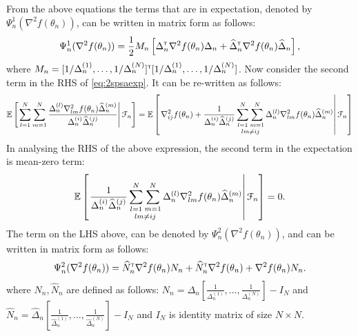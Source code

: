 From the above equations the  terms that are in expectation, denoted by  $\Psi_n^1(\nabla^2 f(\theta_n))$, can be written in matrix form as follows:
\begin{align}
\Psi_n^1(\nabla^2 f(\theta_n)) =\frac{1}{2} M_n \left[\Delta_n^\mathsf{\scriptscriptstyle T} \nabla^2 f(\theta_n) \Delta_n + \widehat\Delta_n^\mathsf{\scriptscriptstyle T} \nabla^2 f(\theta_n) \widehat\Delta_n\right],
\end{align}
where $M_n = [1/\Delta_n^{(1)}, \ldots ,1/\Delta_n^{(N)}]^\mathsf{\scriptscriptstyle T} [1/\Delta_n^{(1)}, \ldots ,1/\Delta_n^{(N)}]$.
Now consider the second term in the RHS of \eqref{eq:2spsaexp}. It can be re-written as follows:
\begin{align}
\mathbb{E}\left[\left. \sum\limits_{l=1}^N\sum\limits_{m=1}^N \frac{\Delta_n^{(l)} \nabla^2_{lm} f(\theta_n) \widehat\Delta_n^{(m)}}{\Delta_n^{(i)} \widehat\Delta_n^{(j)}} \right | \mathcal{F}_n\right] = \mathbb{E}\left[\left.\nabla^2_{ij} f(\theta_n) + \frac{1}{\Delta_n^{(i)} \widehat\Delta_n^{(j)}} \mathop{\sum_{l=1}^N \sum_{m=1}^{N}}_{lm \neq ij} \Delta_n^{(l)} \nabla^2_{lm} f(\theta_n) \widehat\Delta_n^{(m)} \right | \mathcal{F}_n\right]
\end{align}
In analysing the RHS of the above expression, the second term in the expectation  is mean-zero term:  
\begin{align}
\mathbb{E}\left[\left. \frac{1}{\Delta_n^{(i)} \widehat\Delta_n^{(j)}} \mathop{\sum_{l=1}^N \sum_{m=1}^{N}}_{lm \neq ij} \Delta_n^{(l)} \nabla^2_{lm} f(\theta_n) \widehat\Delta_n^{(m)} \right | \mathcal{F}_n\right] = 0.
\end{align}
The term on the LHS above, can be denoted by $\Psi_n^2(\nabla^2 f(\theta_n))$, and can be written in  matrix form as follows:
\begin{align}
\Psi_n^2(\nabla^2 f(\theta_n)) = \widehat N_n^\mathsf{\scriptscriptstyle T} \nabla^2 f(\theta_n) N_n  + \widehat N_n^\mathsf{\scriptscriptstyle T} \nabla^2 f(\theta_n) + \nabla^2 f(\theta_n) N_n.
\end{align}
where $N_n,\widehat N_n$ are defined as follows: $N_n = \Delta_n \left[\frac{1}{\Delta_n^{(1)}},\ldots,\frac{1}{\Delta_n^{(N)}}\right] - I_N$ and $\widehat N_n = \widehat \Delta_n \left [\frac{1}{\widehat\Delta_n^{(1)}},\ldots,\frac{1}{\widehat \Delta_n^{(N)}}\right] - I_N$ and $I_N$ is  identity matrix of size $N \times N$.
